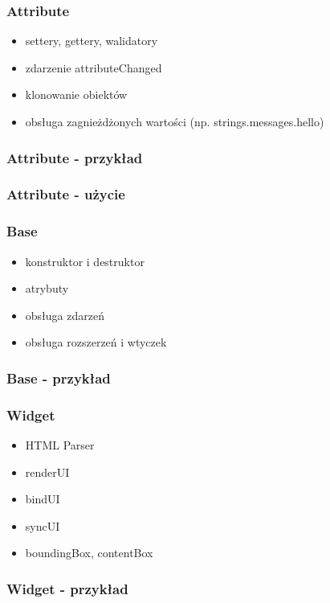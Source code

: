 \documentclass[16pt]{beamer}
\begin{document}
\begin{frame}
  \frametitle{Attribute}
  \begin{itemize}
  \item settery, gettery, walidatory
  \item zdarzenie attributeChanged
  \item klonowanie obiektów
  \item obsługa zagnieżdżonych wartości (np. strings.messages.hello)
  \end{itemize}
\end{frame}

\begin{frame}[fragile]
  \frametitle{Attribute - przykład}
  
\end{frame}

\begin{frame}[fragile]
  \frametitle{Attribute - użycie}
  
\end{frame}

\begin{frame}
  \frametitle{Base}
  \begin{itemize}
  \item konstruktor i destruktor
  \item atrybuty
  \item obsługa zdarzeń
  \item obsługa rozszerzeń i wtyczek
  \end{itemize}
\end{frame}

\begin{frame}[fragile]
  \frametitle{Base - przykład}
  
\end{frame}

\begin{frame}
  \frametitle{Widget}
  \begin{itemize}
  \item HTML Parser
  \item renderUI
  \item bindUI
  \item syncUI
  \item boundingBox, contentBox
  \end{itemize}
\end{frame}

\begin{frame}[fragile]
  \frametitle{Widget - przykład}
  \begin{footnotesize}
    
  \end{footnotesize}
\end{frame}
\end{document}
